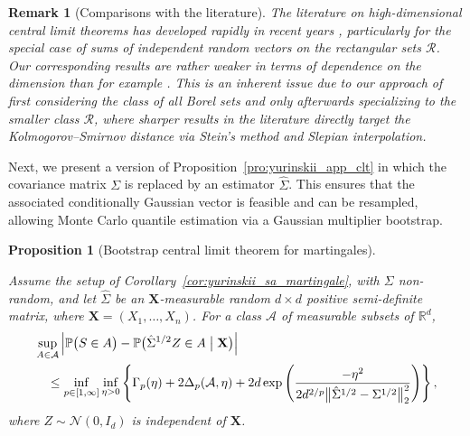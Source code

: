 \documentclass[11pt,lof]{puthesis}
\renewcommand{\P}{\ensuremath{\mathbb{P}}}
\newcommand{\R}{\ensuremath{\mathbb{R}}}
\newcommand{\bX}{\ensuremath{\mathbf{X}}}
\newcommand{\cN}{\ensuremath{\mathcal{N}}}
\newcommand{\cR}{\ensuremath{\mathcal{R}}}
\newcommand{\cA}{\ensuremath{\mathcal{A}}}
\theoremstyle{break}
\newtheorem{proposition}{Proposition}[section]
\newtheorem{remark}{Remark}[section]
\theoremstyle{proof}
\begin{document}
\begin{remark}[Comparisons with the literature]

  The literature on high-dimensional central limit theorems
  has developed rapidly in recent years
  \citep[see][and references therein]{%
    zhai2018high,%
    koike2021notes,%
    buzun2022strong,%
    lopes2022central,%
    chernozhukov2023nearly%
  },
  particularly for the special case of
  sums of independent random vectors
  on the rectangular sets $\cR$.
  Our corresponding results are rather weaker in terms of
  dependence on the dimension than for example
  \citet[Theorem~2.1]{chernozhukov2023nearly}.
  This is an inherent issue due to our approach of first
  considering the class of all Borel sets
  and only afterwards specializing to the smaller class $\cR$,
  where sharper results in the literature directly target the
  Kolmogorov--Smirnov distance via Stein's method and Slepian interpolation.
\end{remark}

Next, we present a version of Proposition~\ref{pro:yurinskii_app_clt} in which
the covariance
matrix $\Sigma$ is replaced by an estimator $\hat \Sigma$. This ensures that
the associated conditionally Gaussian vector is feasible and can be resampled,
allowing Monte Carlo quantile estimation via a Gaussian
multiplier bootstrap.

\begin{proposition}[Bootstrap central limit theorem for martingales]%
  \label{pro:yurinskii_app_bootstrap}

  Assume the setup of Corollary~\ref{cor:yurinskii_sa_martingale},
  with $\Sigma$ non-random,
  and let $\hat \Sigma$ be an $\bX$-measurable random
  $d \times d$ positive semi-definite matrix,
  where $\bX = (X_1, \ldots, X_n)$.
  For a class $\cA$ of measurable subsets of $\R^d$,
  \begin{align*}
    &\sup_{A\in \cA}
    \left|
    \P\big(S \in A\big)
    - \P\big(\hat \Sigma^{1/2} Z \in A \bigm| \bX \big)
    \right| \\
    &\quad\leq
    \inf_{p \in [1,\infty]} \inf_{\eta>0}
    \left\{ \Gamma_p(\eta) + 2 \Delta_p(\cA, \eta)
      + 2d \exp\left(\frac{-\eta^2}
        {2d^{2/p}\big\|\hat \Sigma^{1/2} - \Sigma^{1/2}\big\|_2^2}
      \right)
    \right\},
  \end{align*}
  where $Z \sim \cN(0,I_d)$ is independent of $\bX$.
\end{proposition}
\end{document}
